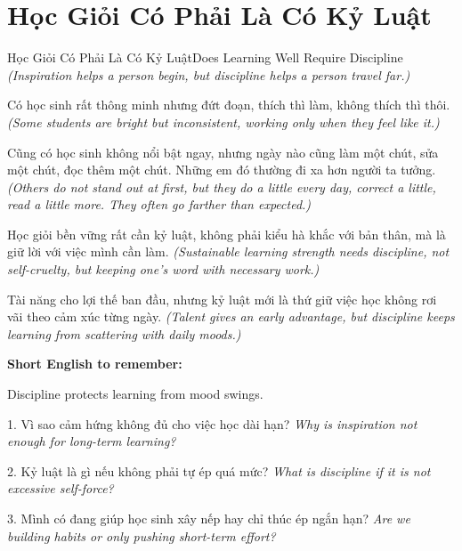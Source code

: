 \section{Học Giỏi Có Phải Là Có Kỷ Luật}
\begin{truyen}{Học Giỏi Có Phải Là Có Kỷ Luật}{Does Learning Well Require Discipline}
\textit{(Inspiration helps a person begin, but discipline helps a person travel far.)}

Có học sinh rất thông minh nhưng đứt đoạn, thích thì làm, không thích thì thôi.
\textit{(Some students are bright but inconsistent, working only when they feel like it.)}

Cũng có học sinh không nổi bật ngay, nhưng ngày nào cũng làm một chút, sửa một chút, đọc thêm một chút. Những em đó thường đi xa hơn người ta tưởng.
\textit{(Others do not stand out at first, but they do a little every day, correct a little, read a little more. They often go farther than expected.)}

Học giỏi bền vững rất cần kỷ luật, không phải kiểu hà khắc với bản thân, mà là giữ lời với việc mình cần làm.
\textit{(Sustainable learning strength needs discipline, not self-cruelty, but keeping one's word with necessary work.)}
\end{truyen}

\begin{baihoc}
Tài năng cho lợi thế ban đầu, nhưng kỷ luật mới là thứ giữ việc học không rơi vãi theo cảm xúc từng ngày.
\textit{(Talent gives an early advantage, but discipline keeps learning from scattering with daily moods.)}
\end{baihoc}

\begin{ghinhoanh}
\textbf{Short English to remember:}

Discipline protects learning from mood swings.

\end{ghinhoanh}

\begin{tuhocnhanh}
1. Vì sao cảm hứng không đủ cho việc học dài hạn? \textit{Why is inspiration not enough for long-term learning?}

2. Kỷ luật là gì nếu không phải tự ép quá mức? \textit{What is discipline if it is not excessive self-force?}

3. Mình có đang giúp học sinh xây nếp hay chỉ thúc ép ngắn hạn? \textit{Are we building habits or only pushing short-term effort?}
\end{tuhocnhanh}
\ngancach

